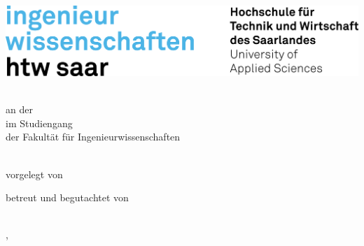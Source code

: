 \begin{titlepage}\linespread{1.5}\selectfont
\includegraphics[width=\linewidth]{Graphics/htw-logo.png}
  \begin{center}
    \large  
    \hfill
    \vfill
    \begingroup
      \Large\bfseries\myDegreeType 
    \endgroup
		
		\bigskip
		
    \myDegree \\ 
    an der \myUni \\
    im Studiengang \myDegreeCourse \\
    der Fakultät für Ingenieurwissenschaften \\ 
    
  \vfill
	
  \begingroup
    \Large\bfseries\myTitle 
  \endgroup
	
	\bigskip
	
  vorgelegt von \\
  \myName
	
  \vfill
	
  betreut und begutachtet von \\
  \myFirstProf \\
	
  \vfill
	
  \myLocation, \myTime                   

    \end{center}       
\end{titlepage}   
